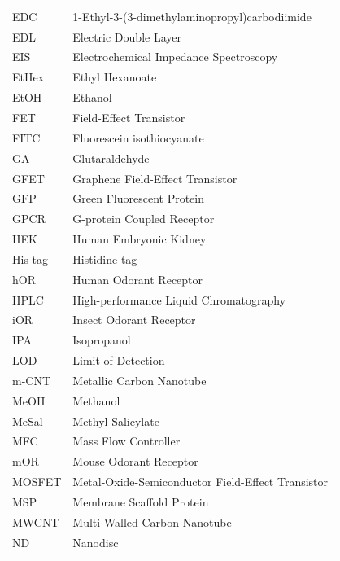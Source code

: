 \documentclass[
  a4paper,
]{scrbook}
\begin{document}
\begin{spacing}{1.2}
\newpage
\fancyhf{} %
\thispagestyle{fancy} %
\renewcommand{\headrulewidth}{0pt}
\fancyfoot[L]{\thepage} %
\begin{table}[H]
  \begin{tabular}{@{}p{} p{}@{}}  %
    EDC  & 1-Ethyl-3-(3-dimethylaminopropyl)carbodiimide  \\[5pt]
    EDL  & Electric Double Layer  \\[5pt]
    EIS  & Electrochemical Impedance Spectroscopy  \\[5pt]
    EtHex  & Ethyl Hexanoate  \\[5pt]
    EtOH  & Ethanol  \\[5pt]
    FET  & Field-Effect Transistor  \\[5pt]
    FITC  & Fluorescein isothiocyanate  \\[5pt]
    GA  & Glutaraldehyde  \\[5pt]
    GFET  & Graphene Field-Effect Transistor  \\[5pt]
    GFP  & Green Fluorescent Protein  \\[5pt]
    GPCR  & G-protein Coupled Receptor  \\[5pt]
    HEK  & Human Embryonic Kidney  \\[5pt]
    His-tag  & Histidine-tag  \\[5pt]
    hOR  & Human Odorant Receptor  \\[5pt]
    HPLC  & High-performance Liquid Chromatography   \\[5pt]
    iOR  & Insect Odorant Receptor  \\[5pt]
    IPA  & Isopropanol  \\[5pt]
    LOD  & Limit of Detection  \\[5pt]
    m-CNT  & Metallic Carbon Nanotube   \\[5pt]
    MeOH  & Methanol   \\[5pt]
    MeSal  & Methyl Salicylate   \\[5pt]
    MFC  & Mass Flow Controller   \\[5pt]
    mOR  & Mouse Odorant Receptor  \\[5pt]
    MOSFET  & Metal-Oxide-Semiconductor Field-Effect Transistor  \\[5pt]
    MSP  & Membrane Scaffold Protein  \\[5pt]
    MWCNT  & Multi-Walled Carbon Nanotube  \\[5pt]
    ND  & Nanodisc  \\[5pt]
  \end{tabular}
\end{table}


\end{spacing}
\end{document}
